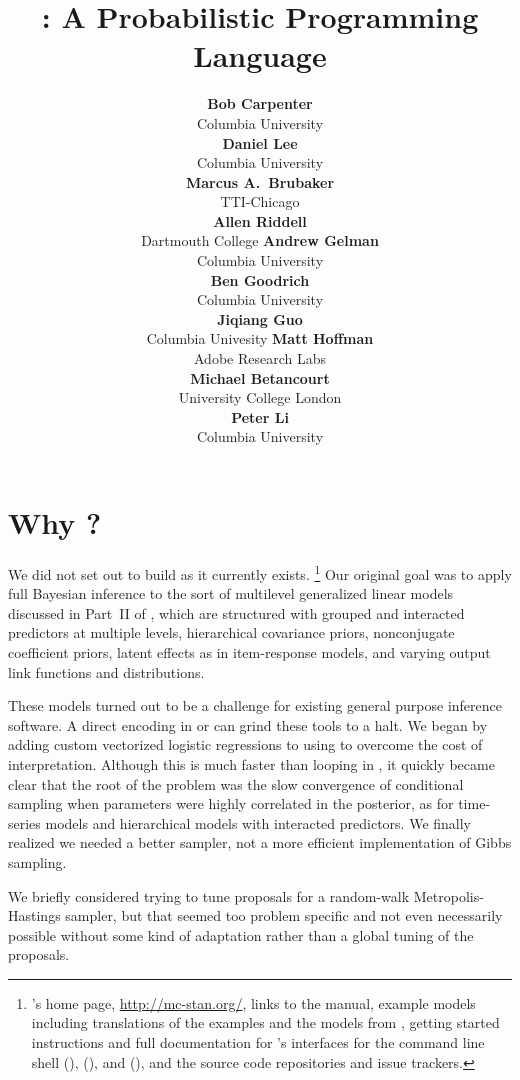 \documentclass[article]{jss}
\author{{\bf\large Bob Carpenter}
        \\ Columbia University
        \\[9pt]
        {\bf\large Daniel Lee}
        \\ Columbia University
        \\[9pt]
        {\bf\large Marcus A.\ Brubaker}
        \\ TTI-Chicago
        \\[9pt]
        {\bf\large Allen Riddell}
        \\ Dartmouth College
    \And
        {\bf\large Andrew Gelman}
        \\ Columbia University
        \\[9pt]
        {\bf\large Ben Goodrich}
        \\ Columbia University
        \\[9pt]
        {\bf\large Jiqiang Guo}
        \\ Columbia Univesity
     \And
        {\bf\large Matt Hoffman}
        \\ Adobe Research Labs
        \\[9pt]
        {\bf\large Michael Betancourt}
        \\ University College London
        \\[9pt]
        {\bf\large Peter Li}
        \\ Columbia University
        \\[9pt]
}
\title{\proglang{Stan}: A Probabilistic Programming Language}
\begin{document}

\section[Why Stan?]{Why ?}

We did not set out to build  as it currently exists.%
%
\footnote{'s home page, \url{http://mc-stan.org/},
  links to the  manual, example models including translations of
  the  examples and the models from \citep{GelmanHill:2007},
  getting started instructions and full documentation for 's
  interfaces for the command line shell (), 
  (), and  (), and the source code repositories
  and issue trackers.}
%
Our original goal was to apply full Bayesian inference to the sort of multilevel
generalized linear models discussed in Part~II of
\citep{GelmanHill:2007}, which are structured with grouped and
interacted predictors at multiple levels, hierarchical covariance
priors, nonconjugate coefficient priors, latent effects as in
item-response models, and varying output link functions and
distributions.

These models turned out to be a challenge for
existing general purpose inference software.  A direct encoding in
 \citep{LunnEtAl:2000,LunnEtAl:2009,LunnEtAl:2012} or
 \citep{Plummer:2003} can grind these tools to a halt.
We began by adding custom vectorized logistic regressions to 
using  to overcome the cost of interpretation.  Although
this is much faster than looping in , it quickly became
clear that the root of the problem was the slow convergence of
conditional sampling when parameters were highly correlated 
in the posterior, as for time-series models and hierarchical models 
with interacted predictors.  We finally realized we needed a better sampler, 
not a more efficient implementation of Gibbs sampling.

We briefly considered trying to tune proposals for a random-walk
Metropolis-Hastings sampler, but that seemed too problem specific and
not even necessarily possible without some kind of adaptation rather
than a global tuning of the proposals. 
\end{document}
